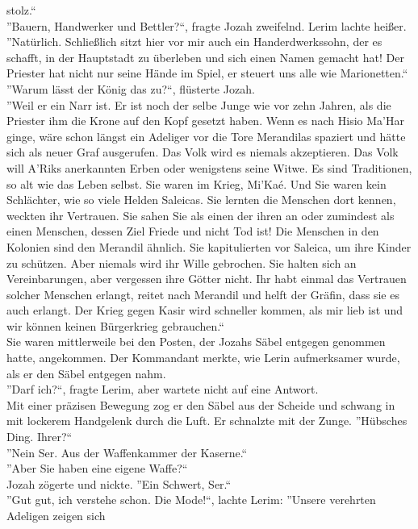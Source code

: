 stolz.``\\
''Bauern, Handwerker und Bettler?``, fragte Jozah zweifelnd.
Lerim lachte heißer. ''Natürlich. Schließlich sitzt hier vor mir auch ein Handerdwerkssohn, der es 
schafft, in der Hauptstadt zu überleben und sich einen Namen gemacht hat! Der Priester hat nicht 
nur seine Hände im Spiel, er steuert uns alle wie Marionetten.``\\
''Warum lässt der König das zu?``, flüsterte Jozah.\\
''Weil er ein Narr ist. Er ist noch der selbe Junge wie vor zehn Jahren, als die Priester ihm die 
Krone auf den Kopf gesetzt haben. Wenn es nach Hisio Ma'Har ginge, wäre schon längst ein 
Adeliger vor die Tore Merandilas spaziert und hätte sich als neuer Graf ausgerufen. Das Volk wird 
es niemals akzeptieren. Das Volk will A'Riks anerkannten Erben oder wenigstens seine Witwe. Es sind 
Traditionen, so alt wie das Leben selbst. Sie waren im Krieg, Mi'Kaé. Und Sie waren kein 
Schlächter, wie so viele Helden Saleicas. Sie lernten die Menschen dort kennen, weckten ihr 
Vertrauen. Sie sahen Sie als einen der ihren an oder zumindest als einen Menschen, dessen Ziel 
Friede und nicht Tod ist! Die Menschen in den Kolonien sind den Merandil ähnlich. Sie kapitulierten 
vor Saleica, um ihre Kinder zu schützen. Aber niemals wird ihr Wille gebrochen. Sie halten sich an 
Vereinbarungen, aber vergessen ihre Götter nicht. Ihr habt einmal das Vertrauen solcher Menschen 
erlangt, reitet nach Merandil und helft der Gräfin, dass sie es auch erlangt. Der Krieg gegen Kasir 
wird schneller kommen, als mir lieb ist und wir können keinen Bürgerkrieg gebrauchen.``\\
Sie waren mittlerweile bei den Posten, der Jozahs Säbel entgegen genommen hatte, angekommen. Der 
Kommandant merkte, wie Lerin aufmerksamer wurde, als er den Säbel entgegen nahm.\\
''Darf ich?``, fragte Lerim, aber wartete nicht auf eine Antwort.\\
Mit einer präzisen Bewegung zog er den Säbel aus der Scheide und schwang in mit lockerem Handgelenk 
durch die Luft. Er schnalzte mit der Zunge. ''Hübsches Ding. Ihrer?``\\
''Nein Ser. Aus der Waffenkammer der Kaserne.``\\
''Aber Sie haben eine eigene Waffe?``\\
Jozah zögerte und nickte. ''Ein Schwert, Ser.``\\
''Gut gut, ich verstehe schon. Die Mode!``, lachte Lerim: ''Unsere verehrten Adeligen zeigen sich 
